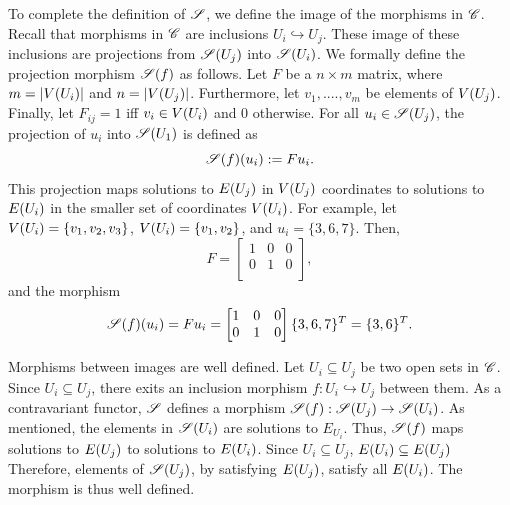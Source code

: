 \documentclass{article}
\begin{document}
To complete the definition of $\mathscr{S}$, we define the image of the morphisms in
$\mathscr{C}$. Recall that morphisms in $\mathscr{C}$ are inclusions $U_i
\hookrightarrow U_j$. These image of these inclusions are projections from
$\mathscr{S}(U_j)$ into $\mathscr{S}(U_i)$.  We formally define the projection morphism
$\mathscr{S}(f)$ as follows. Let $F$ be a $n \times m$ matrix, where $m = |V({U_i})|$
and $n = |V({U_j})|$. Furthermore, let $v_1, ...., v_m$ be elements of
$V({U_j})$. Finally, let $F_{ij} = 1$ iff $v_i \in V({U_i})$ and 0 otherwise.
For all $u_i \in \mathscr{S}(U_j)$, the projection of $u_i$ into $\mathscr{S}(U_1)$ is defined
as
\begin{equation} 
	\mathscr{S}(f)(u_i) := Fu_i.
\end{equation}
This projection maps solutions to $E({U_j})$ in $V({U_j})$ coordinates to solutions
to $E({U_i})$ in the smaller set of coordinates $V({U_i})$. For example, let
$V({U_i}) = \{v_1, v_2, v_3\}$, $V({U_i}) = \{v_1, v_2\}$, and $u_i =
\{3,6,7\}$. Then,
\begin{equation} 
F =
\begin{bmatrix}   
1 & 0 & 0 \\
0 & 1 & 0 \\
\end{bmatrix}, 
\end{equation}
and the morphism
\begin{equation}
\mathscr{S}(f)(u_i) = Fu_i =  \begin{bmatrix}   
1 & 0 & 0 \\
0 & 1 & 0 \\
\end{bmatrix} \{3,6,7\}^T = 
\{3,6\}^T.
\end{equation}

Morphisms between images are well defined. Let $U_i \subseteq U_j$ be two open
sets in $\mathscr{C}$. Since $U_i \subseteq U_j$, there exits an inclusion morphism
$f: U_i \hookrightarrow U_j$ between them. As a contravariant functor, $\mathscr{S}$
defines a morphism $\mathscr{S}(f) : \mathscr{S}(U_j) \rightarrow \mathscr{S}(U_i)$. As mentioned, the
elements in $\mathscr{S}(U_i)$ are solutions to $E_{U_i}$. Thus, $\mathscr{S}(f)$ maps
solutions to $E({U_j})$ to solutions to $E({U_i})$. Since $U_i \subseteq
U_j$, $E({U_i}) \subseteq E({U_j})$ Therefore, elements of $\mathscr{S}(U_j)$, by
satisfying  $E({U_j})$, satisfy all $E({U_i})$.  The morphism is thus well
defined.
\end{document}
